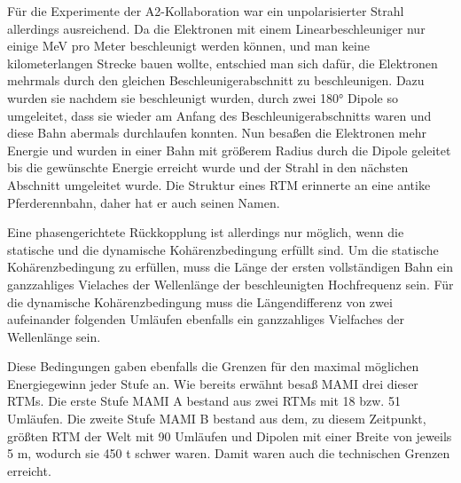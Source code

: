 \documentclass[a4paper,11pt,oneside,final,german,openbib,pdftex]{scrbook}
\begin{document}
{F\"ur die Experimente der A2-Kollaboration war ein unpolarisierter Strahl allerdings ausreichend.
\newline
Da die Elektronen mit einem Linearbeschleuniger nur einige MeV pro Meter beschleunigt werden k\"onnen, und man keine kilometerlangen Strecke bauen wollte, entschied man sich daf\"ur, die Elektronen mehrmals durch den gleichen Beschleunigerabschnitt zu beschleunigen. Dazu wurden sie nachdem sie beschleunigt wurden, durch zwei 180° Dipole so umgeleitet, dass sie wieder am Anfang des Beschleunigerabschnitts waren und diese Bahn abermals durchlaufen konnten. Nun besa{\ss}en die Elektronen mehr Energie und wurden in einer Bahn mit gr\"o{\ss}erem Radius durch die Dipole geleitet bis die gew\"unschte Energie erreicht wurde und der Strahl in den n\"achsten Abschnitt umgeleitet wurde. Die Struktur eines RTM erinnerte an eine antike Pferderennbahn, daher hat er auch seinen Namen.

 Eine phasengerichtete R\"uckkopplung ist allerdings nur m\"oglich, wenn die statische und die dynamische Koh\"arenzbedingung erf\"ullt sind. Um die statische Koh\"arenzbedingung zu erf\"ullen, muss die L\"ange der ersten vollst\"andigen Bahn ein ganzzahliges Vielaches der Wellenl\"ange der beschleunigten Hochfrequenz sein. F\"ur die dynamische Koh\"arenzbedingung muss die L\"angendifferenz von zwei aufeinander folgenden Uml\"aufen ebenfalls ein ganzzahliges Vielfaches der Wellenl\"ange sein\cite{Un08}. 
 
 Diese Bedingungen gaben ebenfalls die Grenzen f\"ur den maximal m\"oglichen Energiegewinn jeder Stufe an. 
\newline
Wie bereits erw\"ahnt besa{\ss} MAMI drei dieser RTMs. Die erste Stufe MAMI A bestand aus zwei RTMs mit 18 bzw. 51 Uml\"aufen. Die zweite Stufe MAMI B bestand aus dem, zu diesem Zeitpunkt, gr\"o{\ss}ten RTM der Welt mit 90 Uml\"aufen und Dipolen mit einer Breite von jeweils 5 m, wodurch sie 450 t schwer waren. Damit waren auch die technischen Grenzen erreicht.\cite{KPh11F}


}
\end{document}

